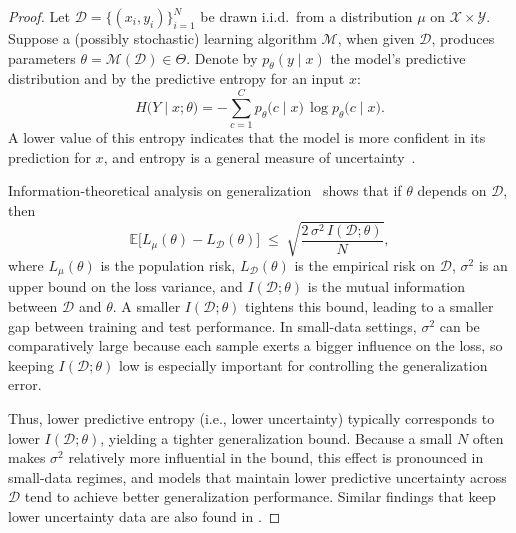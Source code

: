 \begin{proof}
Let \( \mathcal{D} = \{(x_i, y_i)\}_{i=1}^N \) be drawn i.i.d.\ from a distribution \( \mu \) on 
\( \mathcal{X} \times \mathcal{Y} \). Suppose a (possibly stochastic) learning algorithm 
\( \mathcal{M} \), when given \( \mathcal{D} \), produces parameters \( \theta = \mathcal{M}(\mathcal{D}) \in \Theta \). 
Denote by \( p_\theta(y\mid x) \) the model’s predictive distribution and by the predictive entropy for an input \( x \):
\[
H\bigl(Y \mid x;\theta\bigr)
=
-\sum_{c=1}^C
p_\theta\bigl(c\mid x\bigr)\,\log p_\theta\bigl(c\mid x\bigr).
\]
A lower value of this entropy indicates that the 
model is more confident in its prediction for \( x \), and entropy is a general measure of 
uncertainty~\cite{settles2009active, coleman2020selection}.

Information-theoretical analysis on generalization~\cite{xu2017information} shows that 
if \( \theta \) depends on \( \mathcal{D} \), then
\[
\mathbb{E}\bigl[L_{\mu}(\theta) - L_{\mathcal{D}}(\theta)\bigr]
\;\le\;
\sqrt{
  \frac{2\,\sigma^2 \, I(\mathcal{D};\theta)}{N}
},
\]
where \( L_{\mu}(\theta) \) is the population risk, \( L_{\mathcal{D}}(\theta) \) is the empirical risk on \( \mathcal{D} \), 
\( \sigma^2 \) is an upper bound on the loss variance, and \( I(\mathcal{D};\theta) \) is the mutual 
information between \( \mathcal{D} \) and \( \theta \). A smaller \( I(\mathcal{D};\theta) \) tightens this bound, leading 
to a smaller gap between training and test performance. In small-data settings, \( \sigma^2 \) 
can be comparatively large because each sample exerts a bigger influence on the loss, so 
keeping \( I(\mathcal{D};\theta) \) low is especially important for controlling the generalization error.

Thus, lower predictive entropy (i.e., lower uncertainty) typically corresponds to lower 
\( I(\mathcal{D};\theta) \), yielding a tighter generalization bound. Because a small \( N \) often makes 
\( \sigma^2 \) relatively more influential in the bound, this effect is pronounced in 
small-data regimes, and models that maintain lower predictive uncertainty across \( \mathcal{D} \) 
tend to achieve better generalization performance.
Similar findings that keep lower uncertainty data are also found in \cite{sorscher2022beyond, he2024you}.
\end{proof}


